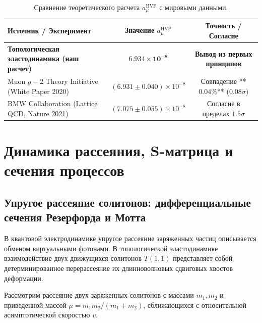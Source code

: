 \documentclass[11pt,a4paper,oneside]{article}
\theoremstyle{plain}
\theoremstyle{definition}
\theoremstyle{remark}
\numberwithin{equation}{section}
\begin{document}
	\begin{table}[h!]
		\centering
		\small
		\caption{Сравнение теоретического расчета $a_\mu^{\text{HVP}}$ с мировыми данными.}
		\label{tab:hvp_comparison}
		\begin{tabularx}{\textwidth}{lcc}
			\toprule
			\textbf{Источник / Эксперимент} & \textbf{Значение $a_\mu^{\text{HVP}}$} & \textbf{Точность / Согласие} \\
			\midrule
			\textbf{Топологическая эластодинамика (наш расчет)} & $\mathbf{6.934 \times 10^{-8}}$ & \textbf{Вывод из первых принципов} \\
			Muon $g-2$ Theory Initiative (White Paper 2020) & $(6.931 \pm 0.040) \times 10^{-8}$ & Совпадение **$0.04\%$** ($0.08\sigma$) \\
			BMW Collaboration (Lattice QCD, Nature 2021) & $(7.075 \pm 0.055) \times 10^{-8}$ & Согласие в пределах $1.5\sigma$ \\
			\bottomrule
		\end{tabularx}
	\end{table}
	
	\section{Динамика рассеяния, S-матрица и сечения процессов}
	
	\subsection{Упругое рассеяние солитонов: дифференциальные сечения Резерфорда и Мотта}
	
	В квантовой электродинамике упругое рассеяние заряженных частиц описывается обменом виртуальными фотонами. В топологической эластодинамике взаимодействие двух движущихся солитонов $T(1,1)$ представляет собой детерминированное перерассеяние их длинноволновых сдвиговых хвостов деформации.
	
	Рассмотрим рассеяние двух заряженных солитонов с массами $m_1, m_2$ и приведенной массой $\mu = m_1 m_2 / (m_1 + m_2)$, сближающихся с относительной асимптотической скоростью $v$. 
	
\end{document}

